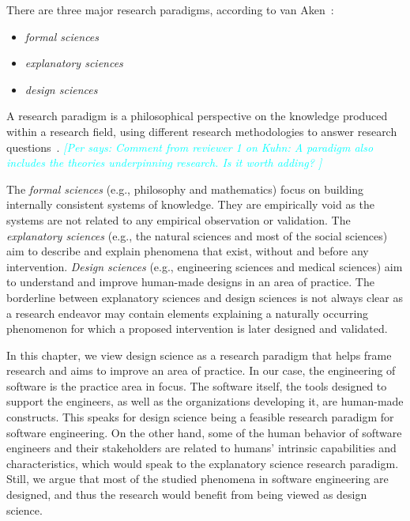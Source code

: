 \documentclass[graybox]{svmult}
\newcommand{\per}[1]{\textcolor{cyan}{{\it [Per says: #1]}}}
\newcommand{\per}[1]{}
\begin{document}
There are three major research paradigms, according to van Aken~\cite{van_aken_management_2004}:
\begin{itemize}
\item \emph{formal sciences} %
\item \emph{explanatory sciences} %
\item \emph{design sciences}%
\end{itemize}

A research paradigm is a philosophical perspective on the knowledge produced within a research field, using different research methodologies to answer research questions~\cite{van_aken_management_2004}. \per{Comment from reviewer 1 on Kuhn: A  paradigm  also includes the theories underpinning research. Is it worth adding? }

The \emph{formal sciences} (e.g., philosophy and mathematics) focus on building internally consistent systems of knowledge. They are empirically void as the systems are not related to any empirical observation or validation. The \emph{explanatory sciences} (e.g., the natural sciences and most of the social sciences) aim to describe and explain phenomena that exist, without and before any intervention. \emph{Design sciences} (e.g., engineering sciences and medical sciences) aim to understand and improve human-made designs in an area of practice. The borderline between explanatory sciences and design sciences is not always clear as a research endeavor may contain elements explaining a naturally occurring phenomenon for which a proposed intervention is later designed and validated. 

In this chapter, we view design science as a research paradigm that helps frame research and aims to improve an area of practice. In our case, the engineering of software is the practice area in focus. The software itself, the tools designed to support the engineers, as well as the organizations developing it, are human-made constructs. This speaks for design science being a feasible research paradigm for software engineering. On the other hand, some of the human behavior of software engineers and their stakeholders are related to humans' intrinsic capabilities and characteristics, which would speak to the explanatory science research paradigm. Still, we argue that most of the studied phenomena in software engineering are designed, and thus the research would benefit from being viewed as design science.
\end{document}
